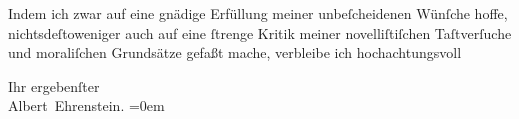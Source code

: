 \pstart
           Indem ich zwar auf eine gnädige Erfüllung meiner \introOben{}unbeſcheidenen\introOben{} Wünſche hoffe, nichtsdeſtoweniger auch auf eine ſtrenge
               Kritik meiner novelliſtiſchen Taſtverſuche und moraliſchen Grundsätze gefaßt mache,
               verbleibe ich hochachtungsvoll\pend
           
\pstart
           Ihr ergebenſter{\\[\baselineskip]}\spacefill\mbox{Albert Ehrenstein.}\pend
           \leftskip=0em{}\endnumbering{}  
      